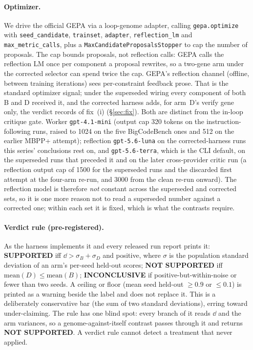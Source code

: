 \documentclass[11pt]{article}
\begin{document}
\paragraph{Optimizer.}
We drive the official GEPA \citep{agrawal2025gepa} via a loop-genome adapter, calling
\texttt{gepa.optimize} with \texttt{seed\_candidate}, \texttt{trainset}, \texttt{adapter},
\texttt{reflection\_lm} and \texttt{max\_metric\_calls}, plus a
\texttt{MaxCandidateProposalsStopper} to cap the number of proposals. The cap bounds proposals,
not reflection calls: GEPA calls the reflection LM once per component a proposal rewrites, so a
two-gene arm under the corrected selector can spend twice the cap. GEPA's reflection channel (offline, between
training iterations) sees per-constraint feedback prose. That is the standard
optimizer signal; under the superseded wiring every component of both B and D received it, and
the corrected harness adds, for arm~D's verify gene only, the verdict records of fix~(i)
(\S\ref{sec:fix}). Both are distinct from the in-loop critique gate. Worker \texttt{gpt-4.1-mini} (output cap 320 tokens on the
instruction-following runs, raised to 1024 on the five BigCodeBench ones and 512 on the earlier
MBPP+ attempt); reflection
\texttt{gpt-5.6-luna} on the corrected-harness runs this series' conclusions rest on, and
\texttt{gpt-5.6-terra}, which is the CLI default, on the superseded runs that preceded it and on
the later cross-provider critic run (a reflection output cap of 1500 for the superseded runs and
the discarded first attempt at the four-arm re-run, and 3000 from the clean re-run onward). The reflection model is therefore \emph{not} constant across the
superseded and corrected sets, so it is one more reason not to read a superseded number against a
corrected one; within each set it is fixed, which is what the contrasts require.

\paragraph{Verdict rule (pre-registered).}
As the harness implements it and every released run report prints it:
\textbf{SUPPORTED} iff $\dd > \sigma_B + \sigma_D$ and positive, where $\sigma$ is the
population standard deviation of an arm's per-seed held-out scores;
\textbf{NOT SUPPORTED} iff $\mathrm{mean}(D) \le \mathrm{mean}(B)$;
\textbf{INCONCLUSIVE} if positive-but-within-noise or fewer than two seeds. A ceiling or floor
(mean seed held-out $\ge 0.9$ or $\le 0.1$) is printed as a warning beside the label and does not
replace it. This is a
deliberately conservative bar (the sum of two standard deviations), erring
toward under-claiming. The rule has one blind spot: every branch of it reads
$\dd$ and the arm variances, so a genome-against-itself contrast passes through it and returns
\textbf{NOT SUPPORTED}. A verdict rule cannot detect a treatment that never applied.
\end{document}

